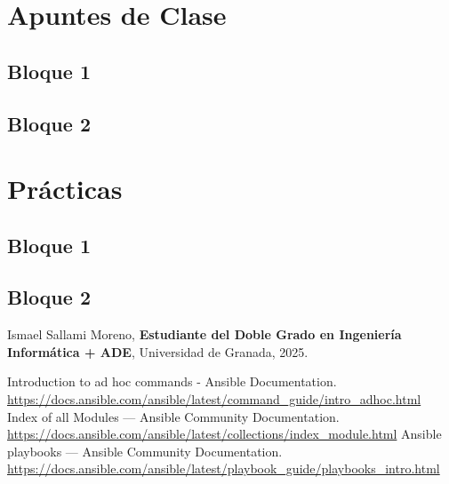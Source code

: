 \documentclass[a4paper,12pt]{book}
\begin{document}
\part{Apuntes de Clase}

\chapter{Bloque 1}



\chapter{Bloque 2}




\newpage
\part{Prácticas}
\chapter{Bloque 1}



\chapter{Bloque 2}



\begin{thebibliography}{99}
Ismael Sallami Moreno, \textbf{Estudiante del Doble Grado en Ingeniería Informática + ADE}, Universidad de Granada, 2025.

 Introduction to ad hoc commands - Ansible Documentation. \url{https://docs.ansible.com/ansible/latest/command_guide/intro_adhoc.html}
 Index of all Modules — Ansible Community Documentation. \url{https://docs.ansible.com/ansible/latest/collections/index_module.html}
 Ansible playbooks — Ansible Community Documentation. \url{https://docs.ansible.com/ansible/latest/playbook_guide/playbooks_intro.html}

\end{thebibliography}
\end{document}
